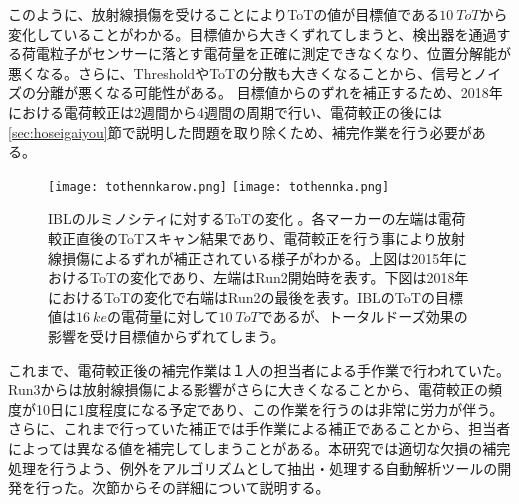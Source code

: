 
このように、放射線損傷を受けることによりToTの値が目標値である$10\ \si{ToT}$から変化していることがわかる。目標値から大きくずれてしまうと、検出器を通過する荷電粒子がセンサーに落とす電荷量を正確に測定できなくなり、位置分解能が悪くなる。さらに、ThresholdやToTの分散も大きくなることから、信号とノイズの分離が悪くなる可能性がある。
目標値からのずれを補正するため、2018年における電荷較正は2週間から4週間の周期で行い、電荷較正の後には\ref{sec:hoseigaiyou}節で説明した問題を取り除くため、補完作業を行う必要がある。

\begin{figure}[tbp]
  \centering
  \texttt{[image: tothennkarow.png]}
  \texttt{[image: tothennka.png]}
  \caption[ルミノシティに対するToTの変化]{IBLのルミノシティに対するToTの変化 。各マーカーの左端は電荷較正直後のToTスキャン結果であり、電荷較正を行う事により放射線損傷によるずれが補正されている様子がわかる。上図は2015年におけるToTの変化\cite{tothenkarow}であり、左端はRun2開始時を表す。下図は2018年におけるToTの変化\cite{tothennka}で右端はRun2の最後を表す。IBLのToTの目標値は$16\ \si{ke}$の電荷量に対して$10\ \si{ToT}$であるが、トータルドーズ効果の影響を受け目標値からずれてしまう。}
  \label{fig:thresholdhennka}
\end{figure}





これまで、電荷較正後の補完作業は１人の担当者による手作業で行われていた。Run3からは放射線損傷による影響がさらに大きくなることから、電荷較正の頻度が10日に1度程度になる予定であり、この作業を行うのは非常に労力が伴う。さらに、これまで行っていた補正では手作業による補正であることから、担当者によっては異なる値を補完してしまうことがある。本研究では適切な欠損の補完処理を行うよう、例外をアルゴリズムとして抽出・処理する自動解析ツールの開発を行った。次節からその詳細について説明する。


